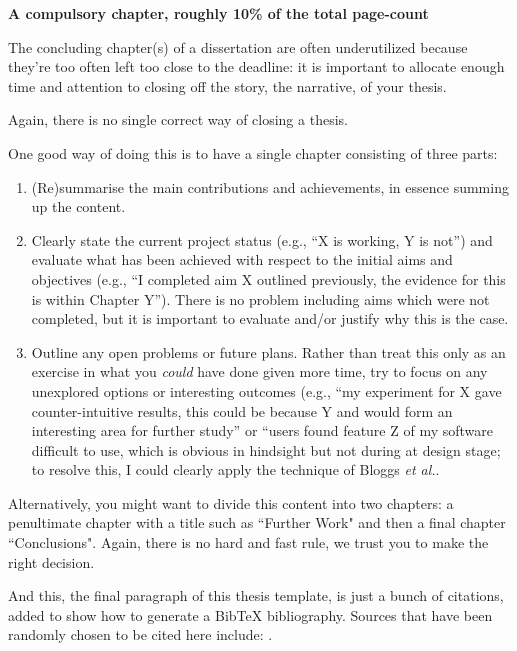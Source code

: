 {\bf A compulsory chapter,  roughly 10\% of the total page-count}
\vspace{1cm} 

\noindent
The concluding chapter(s) of a dissertation are often underutilized because they're 
too often left too close to the deadline: it is important to allocate enough time and 
attention to closing off the story, the narrative, of your thesis.

Again, there is no single correct way of closing a thesis. 

One good way of doing this is to have a single chapter consisting of three parts:

\begin{enumerate}
	\item (Re)summarise the main contributions and achievements, in essence
	      summing up the content.
	\item Clearly state the current project status (e.g., ``X is working, Y 
	      is not'') and evaluate what has been achieved with respect to the 
	      initial aims and objectives (e.g., ``I completed aim X outlined 
	      previously, the evidence for this is within Chapter Y'').  There 
	      is no problem including aims which were not completed, but it is 
	      important to evaluate and/or justify why this is the case.
	\item Outline any open problems or future plans.  Rather than treat this
	      only as an exercise in what you {\em could} have done given more 
	      time, try to focus on any unexplored options or interesting outcomes
	      (e.g., ``my experiment for X gave counter-intuitive results, this 
	      could be because Y and would form an interesting area for further 
	      study'' or ``users found feature Z of my software difficult to use,
	      which is obvious in hindsight but not during at design stage; to 
	      resolve this, I could clearly apply the technique of Bloggs {\em et al.}.
\end{enumerate}

Alternatively, you might want to divide this content into two chapters: a penultimate chapter with a title such as ``Further Work" and then a final chapter ``Conclusions". Again, there is no hard and fast rule, we trust you to make the right decision. 
		
		And this, the final paragraph of this thesis template, is just a bunch of citations, added to show how to generate a BibTeX bibliography. Sources that have been randomly chosen to be cited here include:
		\cite{miller_etal_2018_clojure,webber_marwan_2015,touretzky_2013_lisp,eckmann_etal_1987,marwan_2011,vach_2015,shiller_2017,vytelingum_2006,tesfatsion_2002,rust_etal_1992}.
